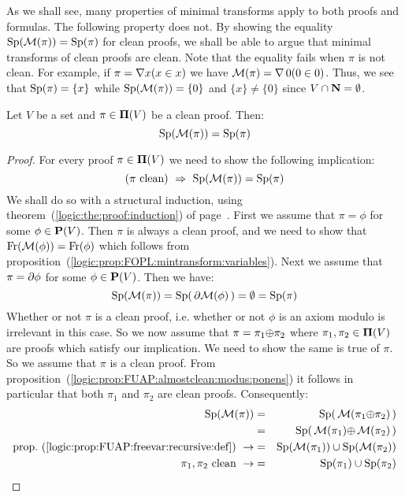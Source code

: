 As we shall see, many properties of minimal transforms apply to both
proofs and formulas. The following property does not. By showing the
equality $\mbox{\rm Sp}({\cal M}(\pi))=\mbox{\rm Sp}(\pi)$ for clean proofs, we
shall be able to argue that minimal transforms of clean proofs are
clean. Note that the equality fails when $\pi$ is not clean. For
example, if $\pi=\mbox{$\nabla$} x(x\in x)$ we have ${\cal M}(\pi)=\mbox{$\nabla$}\,0(0\in
0)$. Thus, we see that $\mbox{\rm Sp}(\pi)=\{x\}$ while $\mbox{\rm Sp}({\cal
M}(\pi))=\{0\}$ and $\{x\}\neq\{0\}$ since $V\cap\mbox{$\bf N$}=\emptyset$.


\begin{prop}\label{logic:prop:FUAP:mintransproof:variable}
Let $V$ be a set and $\pi\in\mbox{${\bf\Pi}(V)$}$ be a clean proof. Then:
    \[
    \mbox{\rm Sp}({\cal M}(\pi))=\mbox{\rm Sp}(\pi)
    \]
\end{prop}
\begin{proof}
For every proof $\pi\in\mbox{${\bf\Pi}(V)$}$ we need to show the following
implication:
    \[
    (\mbox{$\pi$ clean})\ \Rightarrow\ \spec({\cal M}(\pi))=\spec(\pi)
    \]
We shall do so with a structural induction, using
theorem~(\ref{logic:the:proof:induction}) of
page~\pageref{logic:the:proof:induction}. First we assume that
$\pi=\phi$ for some $\phi\in\mbox{${\bf P}(V)$}$. Then $\pi$ is always a clean
proof, and we need to show that $\mbox{\rm Fr}({\cal M}(\phi))=\mbox{\rm Fr}(\phi)$
which follows from
proposition~(\ref{logic:prop:FOPL:mintransform:variables}). Next we
assume that $\pi=\mbox{$\partial$}\phi$ for some $\phi\in\mbox{${\bf P}(V)$}$. Then we have:
    \[
    \mbox{\rm Sp}({\cal M}(\pi))=\mbox{\rm Sp}(\,\mbox{$\partial$}{\cal
    M}(\phi)\,)=\emptyset=\mbox{\rm Sp}(\pi)
    \]
Whether or not $\pi$ is a clean proof, i.e. whether or not $\phi$ is
an axiom modulo is irrelevant in this case. So we now assume that
$\pi=\pi_{1}\mbox{$\oplus$}\pi_{2}$ where $\pi_{1},\pi_{2}\in\mbox{${\bf\Pi}(V)$}$ are proofs
which satisfy our implication. We need to show the same is true of
$\pi$. So we assume that $\pi$ is a clean proof. From
proposition~(\ref{logic:prop:FUAP:almostclean:modus:ponens}) it
follows in particular that both $\pi_{1}$ and $\pi_{2}$ are clean
proofs. Consequently:
    \begin{eqnarray*}
    \spec({\cal M}(\pi))&=&\spec(\,{\cal M}(\pi_{1}\pon\pi_{2})\,)\\
    &=&\spec(\,{\cal M}(\pi_{1})\pon\,{\cal M}(\pi_{2})\,)\\
    \mbox{prop.~(\ref{logic:prop:FUAP:freevar:recursive:def})}\ \rightarrow
    &=&\spec({\cal M}(\pi_{1}))\cup\spec({\cal M}(\pi_{2}))\\
    \mbox{$\pi_{1},\pi_{2}$ clean}\ \rightarrow
    &=&\spec(\pi_{1})\cup\spec(\pi_{2})\\

\end{eqnarray*}
\end{proof}
